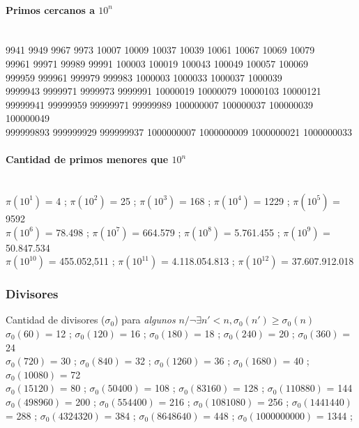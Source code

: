 \documentclass[10pt, landscape, twocolumn, a4paper, notitlepage]{article}
\begin{document}
\paragraph{Primos cercanos a $10^n$}\ \\
9941 9949 9967 9973 10007 10009 10037 10039 10061 10067 10069 10079\\
99961 99971 99989 99991 100003 100019 100043 100049 100057 100069\\
999959 999961 999979 999983 1000003 1000033 1000037 1000039\\
9999943 9999971 9999973 9999991 10000019 10000079 10000103 10000121\\
99999941 99999959 99999971 99999989 100000007 100000037 100000039 100000049\\
999999893 999999929 999999937 1000000007 1000000009 1000000021 1000000033

\paragraph{Cantidad de primos menores que $10^n$}\ \\
$\pi(10^1)$ = 4 ;
$\pi(10^2)$ = 25 ;
$\pi(10^3)$ = 168 ;
$\pi(10^4)$ = 1229 ;
$\pi(10^5)$ = 9592 \\
$\pi(10^6)$ = 78.498 ;
$\pi(10^7)$ = 664.579 ;
$\pi(10^8)$ = 5.761.455 ;
$\pi(10^9)$ = 50.847.534 \\
$\pi(10^{10})$ = 455.052,511 ;
$\pi(10^{11})$ = 4.118.054.813 ;
$\pi(10^{12})$ = 37.607.912.018%

\subsubsection{Divisores}
Cantidad de divisores ($\sigma_0$) para \emph{algunos} $n / \neg\exists n'<n, \sigma_0(n') \geqslant \sigma_0(n)$ \\
$\sigma_0(60)$ = 12 ; $\sigma_0(120)$ = 16 ; $\sigma_0(180)$ = 18 ; $\sigma_0(240)$ = 20 ; $\sigma_0(360)$ = 24 \\
$\sigma_0(720)$ = 30 ; $\sigma_0(840)$ = 32 ; $\sigma_0(1260)$ = 36 ; $\sigma_0(1680)$ = 40 ; $\sigma_0(10080)$ = 72 \\ $\sigma_0(15120)$ = 80 ; $\sigma_0(50400)$ = 108 ; $\sigma_0(83160)$ = 128 ; $\sigma_0(110880)$ = 144 \\
$\sigma_0(498960)$ = 200 ; $\sigma_0(554400)$ = 216 ; $\sigma_0(1081080)$ = 256 ; $\sigma_0(1441440)$ = 288 ; $\sigma_0(4324320)$ = 384 ; $\sigma_0(8648640)$ = 448 ;
$\sigma_0(1000000000)$ = 1344 ;
\end{document}
